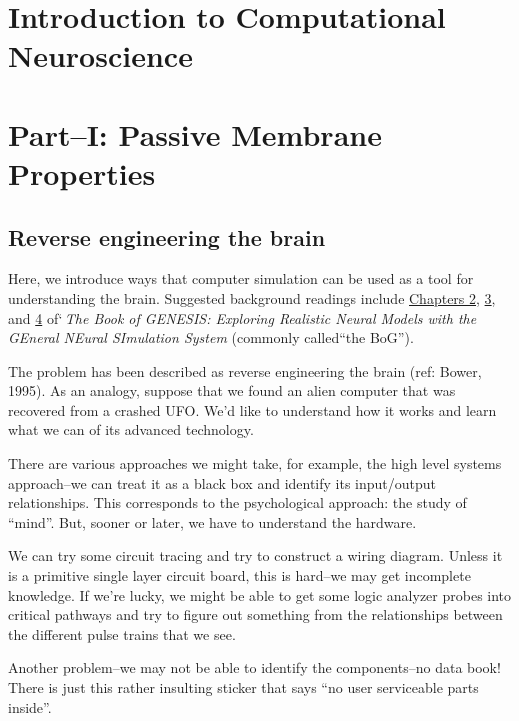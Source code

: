 \documentclass[12pt]{article}
\begin{document}
\section*{Introduction to Computational Neuroscience}
\section*{Part--I: Passive Membrane Properties}

\subsection*{Reverse engineering the brain}

Here, we introduce ways that computer simulation can be used as a tool for understanding the brain. Suggested background readings include \href{../bog-ch2/bog-ch2.pdf}{Chapters 2}, \href{../bog-ch3/bog-ch3.pdf}{3}, and \href{../bog-ch4/bog-ch4.pdf}{4} of`{\it\,The Book of GENESIS: Exploring Realistic Neural Models with the GEneral NEural SImulation System} (commonly called``the BoG''). 

The problem has been described as reverse engineering the brain (ref: Bower, 1995). As an analogy, suppose that we found an alien computer that was recovered from a crashed UFO. We'd like to understand how it works and learn what we can of its advanced technology.

There are various approaches we might take, for example, the high level systems approach--we can treat it as a black box and identify its input/output relationships. This corresponds to the psychological approach: the study of ``mind''. But, sooner or later, we have to understand the hardware.

We can try some circuit tracing and try to construct a wiring diagram. Unless it is a primitive single layer circuit board, this is hard--we may get incomplete knowledge. If we're lucky, we might be able to get some logic analyzer probes into critical pathways and try to figure out something from the relationships between the different pulse trains that we see.

Another problem--we may not be able to identify the components--no data book! There is just this rather insulting sticker that says ``no user serviceable parts inside''.
\end{document}
